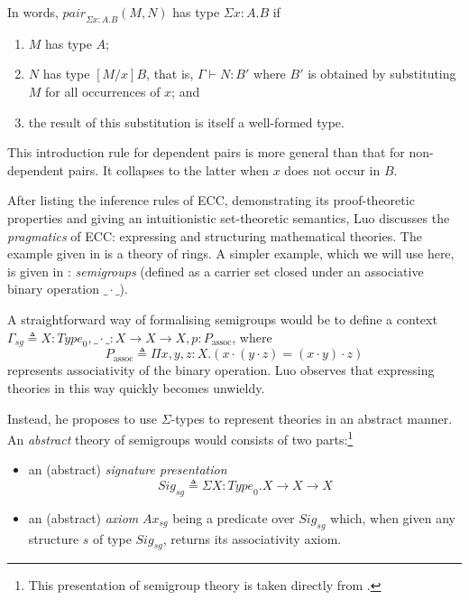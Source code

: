 \documentclass[12pt,toc=bibliography,numbers=noendperiod,
               footnotes=multiple,twoside]{scrartcl}
\begin{document}
In words, \(\textit{pair}_{\Sigma x:A.B} (M,N)\) has type \(\Sigma x:A.B\) if

\begin{enumerate}
\item \(M\) has type \(A\);
\item \(N\) has type \([M/x] B\), that is, \(\Gamma \vdash N:B'\) where \(B'\) is obtained by substituting \(M\) for all occurrences of \(x\); and
\item the result of this substitution is itself a well-formed type.
\end{enumerate}

This introduction rule for dependent pairs is more general than that for non-dependent pairs. It collapses to the latter when \(x\) does not occur in \(B\).

After listing the inference rules of ECC, demonstrating its proof-theoretic properties and giving an intuitionistic set-theoretic semantics, Luo discusses the \textit{pragmatics} of ECC: expressing and structuring mathematical theories. The example given in \textcite{luo_ecc_1989} is a theory of rings. A simpler example, which we will use here, is given in \textcite{luo_extended_1990}: \emph{semigroups} (defined as a carrier set closed under an associative binary operation \(\_\cdot\_\)).

A straightforward way of formalising semigroups would be to define a context \(\Gamma_{sg} \triangleq X : \textit{Type}_0, \_\cdot\_ : X \rightarrow X \rightarrow X, p : P_\textrm{assoc}\), where \[P_\textrm{assoc} \triangleq \Pi x,y,z:X.(x \cdot (y \cdot z) = (x \cdot y) \cdot z)\] represents associativity of the binary operation. Luo observes that expressing theories in this way quickly becomes unwieldy.

Instead, he proposes to use \(\Sigma\)-types to represent theories in an abstract manner. An \emph{abstract} theory of semigroups would consists of two parts:\footnote{This presentation of semigroup theory is taken directly from \textcite[100]{luo_extended_1990}.}

\begin{itemize}
\item an (abstract) \emph{signature presentation} \[\textit{Sig}_{sg} \triangleq \Sigma X : \textit{Type}_0. X \rightarrow X \rightarrow X\]
\item an (abstract) \emph{axiom} \(\textit{Ax}_{sg}\) being a predicate over \(\textit{Sig}_{sg}\) which, when given any structure \(s\) of type \(\textit{Sig}_{sg}\), returns its associativity axiom.
\end{itemize}
\end{document}
